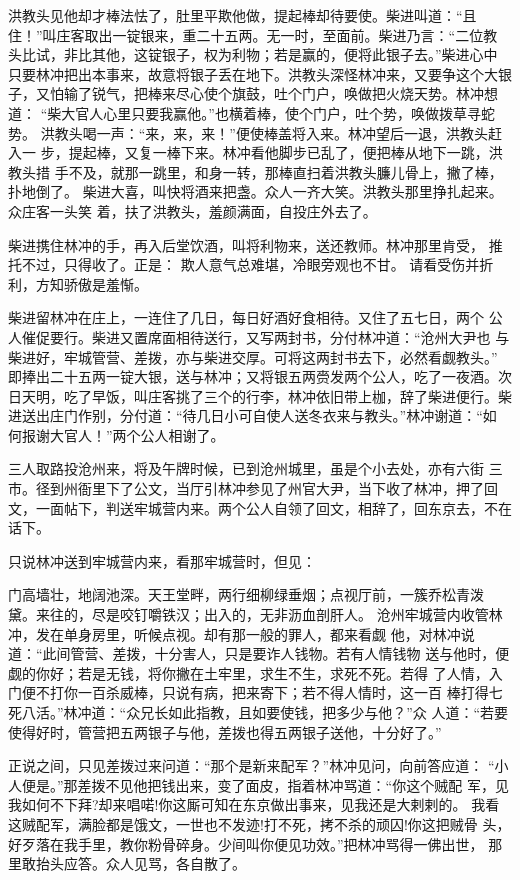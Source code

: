 洪教头见他却才棒法怯了，肚里平欺他做，提起棒却待要使。柴进叫道：“且
住！”叫庄客取出一锭银来，重二十五两。无一时，至面前。柴进乃言：“二位教
头比试，非比其他，这锭银子，权为利物；若是赢的，便将此银子去。”柴进心中
只要林冲把出本事来，故意将银子丢在地下。洪教头深怪林冲来，又要争这个大银
子，又怕输了锐气，把棒来尽心使个旗鼓，吐个门户，唤做把火烧天势。林冲想道：
“柴大官人心里只要我赢他。”也横着棒，使个门户，吐个势，唤做拨草寻蛇势。
洪教头喝一声：“来，来，来！”便使棒盖将入来。林冲望后一退，洪教头赶入一
步，提起棒，又复一棒下来。林冲看他脚步已乱了，便把棒从地下一跳，洪教头措
手不及，就那一跳里，和身一转，那棒直扫着洪教头臁儿骨上，撇了棒，扑地倒了。
柴进大喜，叫快将酒来把盏。众人一齐大笑。洪教头那里挣扎起来。众庄客一头笑
着，扶了洪教头，羞颜满面，自投庄外去了。

柴进携住林冲的手，再入后堂饮酒，叫将利物来，送还教师。林冲那里肯受，
推托不过，只得收了。正是：
欺人意气总难堪，冷眼旁观也不甘。
请看受伤并折利，方知骄傲是羞惭。

柴进留林冲在庄上，一连住了几日，每日好酒好食相待。又住了五七日，两个
公人催促要行。柴进又置席面相待送行，又写两封书，分付林冲道：“沧州大尹也
与柴进好，牢城管营、差拨，亦与柴进交厚。可将这两封书去下，必然看觑教头。”
即捧出二十五两一锭大银，送与林冲；又将银五两赍发两个公人，吃了一夜酒。次
日天明，吃了早饭，叫庄客挑了三个的行李，林冲依旧带上枷，辞了柴进便行。柴
进送出庄门作别，分付道：“待几日小可自使人送冬衣来与教头。”林冲谢道：“如
何报谢大官人！”两个公人相谢了。

三人取路投沧州来，将及午牌时候，已到沧州城里，虽是个小去处，亦有六街
三市。径到州衙里下了公文，当厅引林冲参见了州官大尹，当下收了林冲，押了回
文，一面帖下，判送牢城营内来。两个公人自领了回文，相辞了，回东京去，不在
话下。

只说林冲送到牢城营内来，看那牢城营时，但见：

门高墙壮，地阔池深。天王堂畔，两行细柳绿垂烟；点视厅前，一簇乔松青泼
黛。来往的，尽是咬钉嚼铁汉；出入的，无非沥血剖肝人。
沧州牢城营内收管林冲，发在单身房里，听候点视。却有那一般的罪人，都来看觑
他，对林冲说道：“此间管营、差拨，十分害人，只是要诈人钱物。若有人情钱物
送与他时，便觑的你好；若是无钱，将你撇在土牢里，求生不生，求死不死。若得
了人情，入门便不打你一百杀威棒，只说有病，把来寄下；若不得人情时，这一百
棒打得七死八活。”林冲道：“众兄长如此指教，且如要使钱，把多少与他？”众
人道：“若要使得好时，管营把五两银子与他，差拨也得五两银子送他，十分好了。”

正说之间，只见差拨过来问道：“那个是新来配军？”林冲见问，向前答应道：
“小人便是。”那差拨不见他把钱出来，变了面皮，指着林冲骂道：“你这个贼配
军，见我如何不下拜?却来唱喏!你这厮可知在东京做出事来，见我还是大剌剌的。
我看这贼配军，满脸都是饿文，一世也不发迹!打不死，拷不杀的顽囚!你这把贼骨
头，好歹落在我手里，教你粉骨碎身。少间叫你便见功效。”把林冲骂得一佛出世，
那里敢抬头应答。众人见骂，各自散了。

